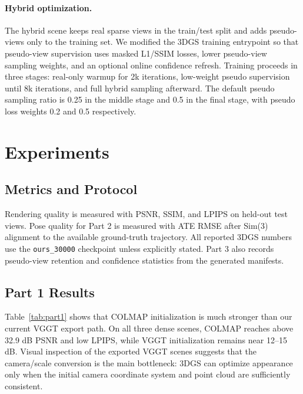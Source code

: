 \documentclass[10pt,twocolumn,letterpaper]{article}
\begin{document}
\paragraph{Hybrid optimization.}
The hybrid scene keeps real sparse views in the train/test split and adds pseudo-views only to the training set.  We modified the 3DGS training entrypoint so that pseudo-view supervision uses masked L1/SSIM losses, lower pseudo-view sampling weights, and an optional online confidence refresh.  Training proceeds in three stages: real-only warmup for 2k iterations, low-weight pseudo supervision until 8k iterations, and full hybrid sampling afterward.  The default pseudo sampling ratio is 0.25 in the middle stage and 0.5 in the final stage, with pseudo loss weights 0.2 and 0.5 respectively.

\section{Experiments}

\subsection{Metrics and Protocol}

Rendering quality is measured with PSNR, SSIM, and LPIPS on held-out test views.  Pose quality for Part 2 is measured with ATE RMSE after Sim(3) alignment to the available ground-truth trajectory.  All reported 3DGS numbers use the \texttt{ours\_30000} checkpoint unless explicitly stated.  Part 3 also records pseudo-view retention and confidence statistics from the generated manifests.

\subsection{Part 1 Results}

Table~\ref{tab:part1} shows that COLMAP initialization is much stronger than our current VGGT export path.  On all three dense scenes, COLMAP reaches above 32.9 dB PSNR and low LPIPS, while VGGT initialization remains near 12--15 dB.  Visual inspection of the exported VGGT scenes suggests that the camera/scale conversion is the main bottleneck: 3DGS can optimize appearance only when the initial camera coordinate system and point cloud are sufficiently consistent.
\end{document}

